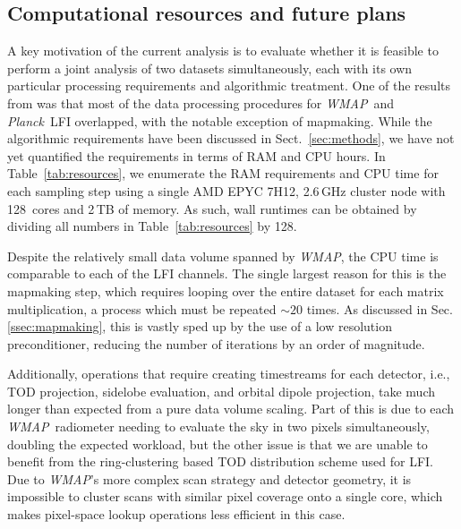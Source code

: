 \documentclass[twocolumn]{../../common/aa}
\def\WMAP{\emph{WMAP}}
\def\Planck{\emph{Planck}}
\begin{document}
\subsection{Computational resources and future plans}
\label{sec:resources}


A key motivation of the current analysis is to evaluate whether it is feasible to perform a joint analysis of two datasets simultaneously, each with its own particular processing requirements and algorithmic treatment. One of the results from \citet{bp17} was that most of the data processing procedures for  \WMAP\ and \Planck\ LFI overlapped, with the notable exception of mapmaking. While the algorithmic requirements have been discussed in Sect.~\ref{sec:methods}, we have not yet quantified the requirements in terms of RAM and CPU hours. In Table~\ref{tab:resources}, we enumerate the RAM requirements and CPU time for each sampling step using a single AMD EPYC 7H12, 2.6\,GHz cluster node with 128~cores and 2\,TB of memory. As such, wall runtimes can be obtained by dividing all numbers in Table~\ref{tab:resources} by 128.

Despite the relatively small data volume spanned by \WMAP, the CPU time is comparable to each of the LFI channels.  The single largest reason for this is the mapmaking step, which requires looping over the entire dataset for each matrix multiplication, a process which must be repeated $\sim20$ times. As discussed in Sec. \ref{ssec:mapmaking}, this is vastly sped up by the use of a low resolution preconditioner, reducing the number of iterations by an order of magnitude.


Additionally, operations that require creating timestreams for each detector, i.e., TOD projection, sidelobe evaluation, and orbital dipole projection, take much longer than expected from a pure data volume scaling. Part of this is due to each \WMAP\ radiometer needing to evaluate the sky in two pixels simultaneously, doubling the expected workload, but the other issue is that we are unable to benefit from the ring-clustering based TOD distribution scheme used for LFI. Due to \WMAP's more complex scan strategy and detector geometry, it is impossible to cluster scans with similar pixel coverage onto a single core, which makes pixel-space lookup operations less efficient in this case.
\end{document}
